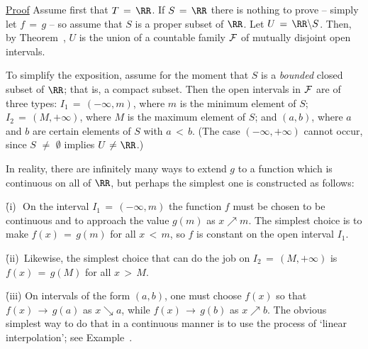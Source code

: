 \V

        \underline{Proof} Assume first that $T \,=\, {\RR}$.
    If $S \,=\, {\RR}$ there is nothing to prove -- simply let $f \,=\, g$ -- so assume that $S$ is a proper subset of ${\RR}$.
    Let $U \,=\, {\RR}{\setminus}S$.
    Then, by Theorem~, $U$ is the union of a countable family ${\cal F}$ of mutually disjoint open intervals.

        To simplify the exposition, assume for the moment that $S$ is a {\em bounded} closed subset of ${\RR}$; that is, a compact subset.
    Then the open intervals in ${\cal F}$ are of three types: $I_{1} \,=\, (-{\infty},m)$, where $m$ is the minimum element of $S$;
    $I_{2} \,=\, (M,+{\infty})$, where $M$ is the maximum element of $S$;
    and $(a,b)$, where $a$ and $b$ are certain elements of $S$ with $a\,<\,b$.
    (The case $(-{\infty},+{\infty})$ cannot occur, since $S \,\,{\neq}\,\, {\emptyset}$ implies $U \,\,{\neq}\,\, {\RR}$.)

        In reality, there  are infinitely many ways to extend $g$ to a function which is continuous on all of ${\RR}$, but perhaps the simplest one is constructed as follows:

        \h (i)\,\, On the interval $I_{1} \,=\, (-{\infty},m)$ the function $f$ must be chosen to be continuous and to approach the value $g(m)$ as $x{\nearrow}m$.
    The simplest choice is to make $f(x) \,=\, g(m)$ for all $x\,<\,m$, so $f$ is constant on the open interval $I_{1}$.

        \h (ii)\, Likewise, the simplest choice that can do the job on $I_{2} \,=\, (M,+{\infty})$ is $f(x) \,=\, g(M)$ for all $x\,>\,M$.

      \h (iii) On intervals of the form $(a,b)$, one must choose $f(x)$ so that $f(x) \,{\rightarrow}\, g(a)$ as $x{\searrow}a$, while $f(x) \,{\rightarrow}\, g(b)$ as $x{\nearrow}b$.
    The obvious simplest way to do that in a continuous manner is to use the process of `linear interpolation'; see Example~.

